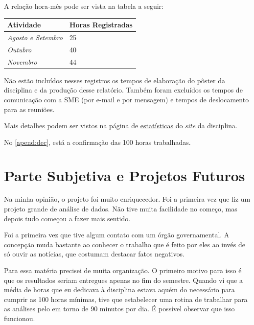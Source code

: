 \documentclass[12pt, a4paper]{article}
\begin{document}
A relação hora-mês pode ser vista na tabela a seguir:

\begin{table}[H]
	\centering
	\begin{tabular}{l|l}
		\textbf{Atividade}                                   & \textbf{Horas Registradas} \\ \hline
		\textit{Agosto e Setembro} & 25                          \\ \hline
		\textit{Outubro}                           & 40                         \\ \hline
		\textit{Novembro}    & 44                         \\ 
	\end{tabular}
\end{table}

Não estão incluídos nesses registros os tempos de elaboração do pôster da disciplina e da produção desse relatório. Também foram excluídos os tempos de comunicação com a SME (por e-mail e por mensagem) e tempos de deslocamento para as reuniões. 

Mais detalhes podem ser vistos na página de \href{https://lsflp.github.io/MAC0213/estatisticas.html}{estatísticas} do \textit{site} da disciplina.

No \autoref{apend:dec}, está a confirmação das 100 horas trabalhadas.

\section{Parte Subjetiva e Projetos Futuros}

Na minha opinião, o projeto foi muito enriquecedor. Foi a primeira vez que fiz um projeto grande de análise de dados. Não tive muita facilidade no começo, mas depois tudo começou a fazer mais sentido.

Foi a primeira vez que tive algum contato com um órgão governamental. A concepção muda bastante ao conhecer o trabalho que é feito por eles ao invés de só ouvir as notícias, que costumam destacar fatos negativos.

Para essa matéria precisei de muita organização. O primeiro motivo para isso é que os resultados seriam entregues apenas no fim do semestre. Quando vi que a média de horas que eu dedicava à disciplina estava aquém do necessário para cumprir as 100 horas mínimas, tive que estabelecer uma rotina de trabalhar para as análises pelo em torno de 90 minutos por dia. É possível observar que isso funcionou. 
\end{document}
